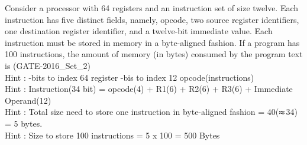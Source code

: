 \begin{questyle}
  \question  Consider a processor with 64 registers and an instruction set of size twelve. Each
             instruction has five distinct fields, namely, opcode, two source register identifiers,
             one destination register identifier, and a twelve-bit immediate value. Each instruction
             must be stored in memory in a byte-aligned fashion. If a program has 100 instructions,
             the amount of memory (in bytes) consumed by the program text is \fillin[500] (GATE-2016\_Set\_2)
             \\ Hint : -bits to index 64 register -bis to index 12 opcode(instructions)
             \\ Hint : \quad Instruction(34 bit) = opcode(4) + R1(6) + R2(6) + R3(6) + Immediate Operand(12)
             \\ Hint : \quad Total size need to store one instruction in byte-aligned fashion = 40(\(\thickapprox\)34) = 5 bytes.
             \\ Hint : \quad Size to store 100 instructions = 5 x 100 = 500 Bytes
\end{questyle}


\begin{comment}

\begin{questyle}
  \question  zzz  (GATE-zzz)

  \begin{choices}
    \choice         zzz
    \choice         zzz
    \choice         zzz
    \choice         zzz
\CorrectChoice
  \end{choices}
\end{questyle}

\begin{questyle}
  \question  zzz  (GATE-zzz)

  \begin{choices}
    \choice         zzz
    \choice         zzz
    \choice         zzz
    \choice         zzz
\CorrectChoice
  \end{choices}
\end{questyle}

\begin{questyle}
  \question  zzz  (GATE-zzz)

  \begin{choices}
    \choice         zzz
    \choice         zzz
    \choice         zzz
    \choice         zzz
\CorrectChoice
  \end{choices}
\end{questyle}

\begin{questyle}
  \question  zzz  (GATE-zzz)

  \begin{choices}
    \choice         zzz
    \choice         zzz
    \choice         zzz
    \choice         zzz
\CorrectChoice
  \end{choices}
\end{questyle}

\end{comment}






